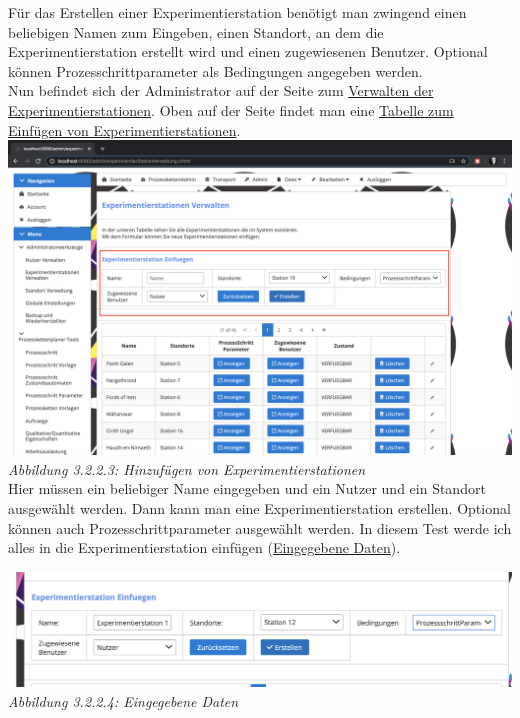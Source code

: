 \documentclass[enabledeprecatedfontcommands,fontsize=12pt,paper=a4,twoside]{scrartcl}
\begin{document}
Für das Erstellen einer Experimentierstation benötigt man zwingend einen beliebigen Namen zum Eingeben, einen Standort, an dem die Experimentierstation erstellt wird und einen zugewiesenen Benutzer. Optional können Prozesschrittparameter als Bedingungen angegeben werden. \\

Nun befindet sich der Administrator auf der Seite zum \hyperlink{sc3.1.3.2}{Verwalten der Experimentierstationen}. Oben auf der Seite findet man eine \hyperlink{sc3.1.3.3}{Tabelle zum Einfügen von Experimentierstationen}. \\

\hypertarget{sc3.1.3.3}{
\includegraphics[width=1\textwidth]{Screenshots/3133.png}
\textit{Abbildung 3.2.2.3: Hinzufügen von Experimentierstationen}
} \\

Hier müssen ein beliebiger Name eingegeben und ein Nutzer und ein Standort ausgewählt werden. Dann kann man eine Experimentierstation erstellen. Optional können auch Prozesschrittparameter ausgewählt werden. In diesem Test werde ich alles in die Experimentierstation einfügen (\hyperlink{sc3.1.3.4}{Eingegebene Daten}). 

\hypertarget{sc3.1.3.4}{
\includegraphics[width=1\textwidth]{Screenshots/3134.png}
\textit{Abbildung 3.2.2.4: Eingegebene Daten}
} \\
\end{document}
